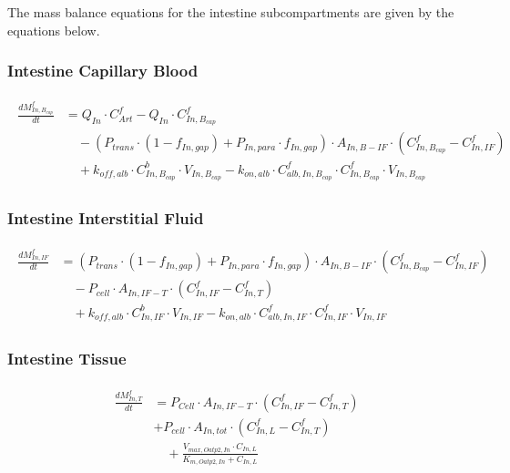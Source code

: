 \documentclass[preprint,12pt,authoryear]{elsarticle}
\begin{document}
The mass balance equations for the intestine subcompartments are given by the equations below.

\subsubsection{Intestine Capillary Blood}

\begin{align}
\begin{aligned}
\frac{dM_{In,B_{cap}}^f}{dt} &= Q_{In} \cdot C_{Art}^f 
- Q_{In} \cdot C_{In,B_{cap}}^f \\
& \quad - (P_{trans}\cdot  (1-f_{In,gap}) + P_{In,para} \cdot f_{In,gap})  \cdot A_{In,B-IF} \cdot (C_{In,B_{cap}}^f - C_{In,IF}^f) \\
& \quad + k_{off,alb} \cdot C_{In,B_{cap}}^b \cdot V_{In,B_{cap}}
- k_{on,alb} \cdot C_{alb,In,B_{cap}}^f \cdot C_{In,B_{cap}}^f \cdot V_{In,B_{cap}}
\end{aligned}
\label{eq:PFOA_intestine_blood}
\end{align}

\subsubsection{Intestine Interstitial Fluid}

\begin{align}
\begin{aligned}
\frac{dM_{In,IF}^f}{dt} &= (P_{trans}\cdot  (1-f_{In,gap}) + P_{In,para} \cdot f_{In,gap}) \cdot A_{In,B-IF} \cdot (C_{In,B_{cap}}^f - C_{In,IF}^f) \\
& \quad - P_{cell} \cdot A_{In,IF-T} \cdot (C_{In,IF}^f - C_{In,T}^f) \\
& \quad + k_{off,alb} \cdot C_{In,IF}^b \cdot V_{In,IF}
- k_{on,alb} \cdot C_{alb,In,IF}^f \cdot C_{In,IF}^f \cdot V_{In,IF}
\end{aligned}
\label{eq:PFOA_intestine_interstitial}
\end{align}

\subsubsection{Intestine Tissue}

\begin{align}
\begin{aligned}
\frac{dM_{In,T}^f}{dt} &=  P_{Cell} \cdot A_{In,IF-T} \cdot (C_{In,IF}^f - C_{In,T}^f) \\
& + P_{cell} \cdot A_{In,tot} \cdot (C_{In,L}^f - C_{In,T}^f)\\
& \quad + \frac{V_{max,Oatp2,In} \cdot C_{In,L}}{K_{m,Oatp2,In} + C_{In,L}}
\end{aligned}
\label{eq:PFOA_intestine_tissue}
\end{align}
\end{document}
